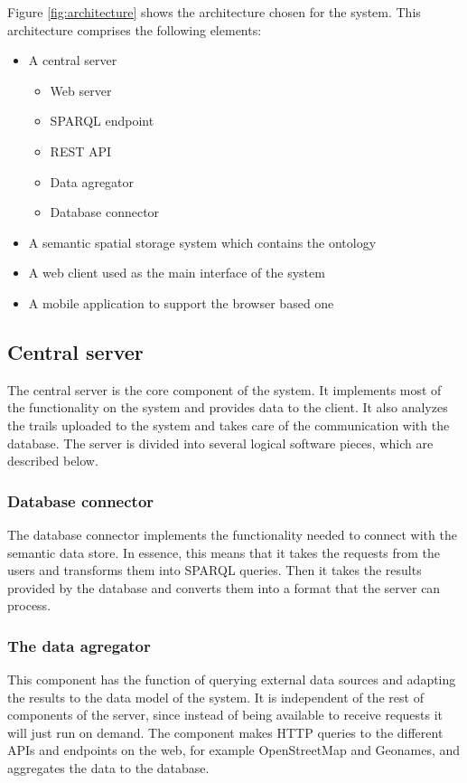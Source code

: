 Figure \ref{fig:architecture} shows the architecture chosen for the system. This architecture comprises the following elements:

\begin{itemize}
\item A central server
  \begin{itemize}
  \item Web server
  \item SPARQL endpoint
  \item REST API
  \item Data agregator
  \item Database connector
  \end{itemize}
\item A semantic spatial storage system which contains the ontology
\item A web client used as the main interface of the system
\item A mobile application to support the browser based one
\end{itemize}

\subsection{Central server}

The central server is the core component of the system. It implements most of the functionality on the system and provides data to the client. It also analyzes the trails uploaded to the system and takes care of the communication with the database. The server is divided into several logical software pieces, which are described below.

\subsubsection*{Database connector}

The database connector implements the functionality needed to connect with the semantic data store. In essence, this means that it takes the requests from the users and transforms them into SPARQL queries. Then it takes the results provided by the database and converts them into a format that the server can process.

\subsubsection*{The data agregator}

This component has the function of querying external data sources and adapting the results to the data model of the system. It is independent of the rest of components of the server, since instead of being available to receive requests it will just run on demand. The component makes HTTP queries to the different APIs and endpoints on the web, for example OpenStreetMap and Geonames, and aggregates the data to the database.

